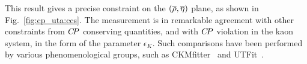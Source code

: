 This result gives a precise constraint on the $(\overline{\rho},\overline{\eta})$ plane,
as shown in Fig.~\ref{fig:cp_uta:ccs}.
The measurement is in remarkable agreement with other constraints from 
$C\!P$ conserving quantities, 
and with $C\!P$ violation in the kaon system, in the form of the parameter $\epsilon_K$.
Such comparisons have been performed by various phenomenological groups,
such as CKMfitter~\cite{Charles:2004jd} 
and UTFit~\cite{Bona:2005vz}.

\begin{figure}[htb]
  \begin{center}
    \hfill
\end{center}
\end{figure}
